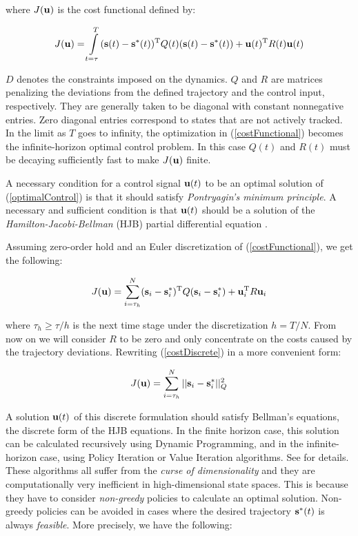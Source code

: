 where $J(\mathbf{u})$ is the cost functional defined by:

\begin{equation}
J(\mathbf{u}) = \int\limits_{t = \tau}^{T} (\mathbf{s}(t) - \mathbf{s}^{*}(t))^{\mathrm{T}}Q(t)(\mathbf{s}(t) - \mathbf{s}^{*}(t)) + \mathbf{u}(t)^{\mathrm{T}}R(t)\mathbf{u}(t) \label{costFunctional}
\end{equation}

$D$ denotes the constraints imposed on the dynamics. $Q$ and $R$ are matrices penalizing the deviations from the defined trajectory and the control input, respectively. They are generally taken to be diagonal with constant nonnegative entries. Zero diagonal entries correspond to states that are not actively tracked. In the limit as $T$ goes to infinity, the optimization in (\ref{costFunctional}) becomes the infinite-horizon optimal control problem. In this case $Q(t)$ and $R(t)$ must be decaying sufficiently fast to make $J(\mathbf{u})$ finite. 

A necessary condition for a control signal $\mathbf{u}(t)$ to be an optimal solution of (\ref{optimalControl}) is that it should satisfy \emph{Pontryagin's minimum principle}. A necessary and sufficient condition is that $\mathbf{u}(t)$ should be a solution of the \emph{Hamilton-Jacobi-Bellman} (HJB) partial differential equation \cite{Bertsekas:DP01}.

Assuming zero-order hold and an Euler discretization of (\ref{costFunctional}), we get the following:

\begin{equation}
J(\mathbf{u}) = \sum\limits_{i = \tau_{h}}^{N} (\mathbf{s}_{i} - \mathbf{s}_{i}^{*})^{\mathrm{T}}Q(\mathbf{s}_{i} - \mathbf{s}_{i}^{*}) + \mathbf{u}_{i}^{\mathrm{T}}R\mathbf{u}_{i} \label{costDiscrete}
\end{equation}

where $\tau_{h} \geq \tau/h$ is the next time stage under the discretization $h = T/N$. From now on we will consider $R$ to be zero and only concentrate on the costs caused by the trajectory deviations. Rewriting (\ref{costDiscrete}) in a more convenient form:

\begin{equation}
J(\mathbf{u}) = \sum\limits_{i = \tau_{h}}^{N} ||\mathbf{s}_{i} - \mathbf{s}_{i}^{*}||_{Q}^{2} \label{costNormed}
\end{equation}

A solution $\mathbf{u}(t)$ of this discrete formulation should satisfy Bellman's equations, the discrete form of the HJB equations. In the finite horizon case, this solution can be calculated recursively using Dynamic Programming, and in the infinite-horizon case, using Policy Iteration or Value Iteration algorithms. See \cite{Bertsekas:DP01} for details. These algorithms all suffer from the \emph{curse of dimensionality} and they are computationally very inefficient in high-dimensional state spaces. This is because they have to consider \emph{non-greedy} policies to calculate an optimal solution. Non-greedy policies can be avoided in cases where the desired trajectory $\mathbf{s}^{*}(t)$ is always \emph{feasible}. More precisely, we have the following: \\


